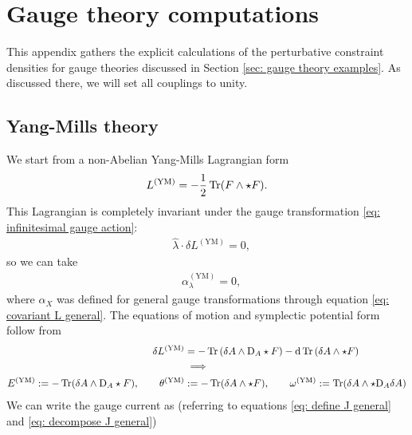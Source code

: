 \documentclass[]{jkpaper}
\theoremstyle{plain}
\theoremstyle{definition}
\newcommand{\fins}{\cdot}
\newcommand{\sd}{\mathrm {d}}
\newcommand{\fd}{\delta}
\newcommand{\DD}[1]{\text{D}_A#1}
\begin{document}
\section{Gauge theory computations}
\label{app: gauge theory examples}

This appendix gathers the explicit calculations of the perturbative constraint densities for gauge theories discussed in Section \ref{sec: gauge theory examples}. As discussed there, we will set all couplings to unity.

\subsection{Yang-Mills theory}
\label{app:YM}
We start from a non-Abelian Yang-Mills Lagrangian form
\begin{equation}\begin{split}\label{eq: YM action}
    L^{(\text{YM})} &= -\frac{1}{2} \Tr(F\wedge\star F).\\
\end{split}\end{equation}
This Lagrangian is completely invariant under the gauge transformation \eqref{eq: infinitesimal gauge action}:
\begin{equation}\begin{split}
    &\hat{\lambda}\fins\fd L^{(\text{YM})} = 0,
\end{split}\end{equation}
so we can take 
\begin{equation}\begin{split}
    &\alpha^{(\text{YM})}_{\lambda}=0,
\end{split}\end{equation}
where $\alpha_X$ was defined for general gauge transformations through equation \eqref{eq: covariant L general}.  The equations of motion and symplectic potential form follow from
\begin{equation}\begin{split}
    \delta L^{(\text{YM})} 
    &=-\Tr\left(\delta A\wedge \DD\star F\right)-\sd\Tr\left(\delta A\wedge \star F\right)\\
    &\implies\\
    E^{(\text{YM})}:=-\Tr(\fd A\wedge \DD\star F), \qquad \theta^{(\text{YM})}&:=-\Tr(\fd A\wedge\star F),\qquad \omega^{(\text{YM})}:=\Tr(\delta A\wedge \star \DD \delta A)
\end{split}\end{equation}
We can write the gauge current as (referring to equations \eqref{eq: define J general} and \eqref{eq: decompose J general}) 
\end{document}
